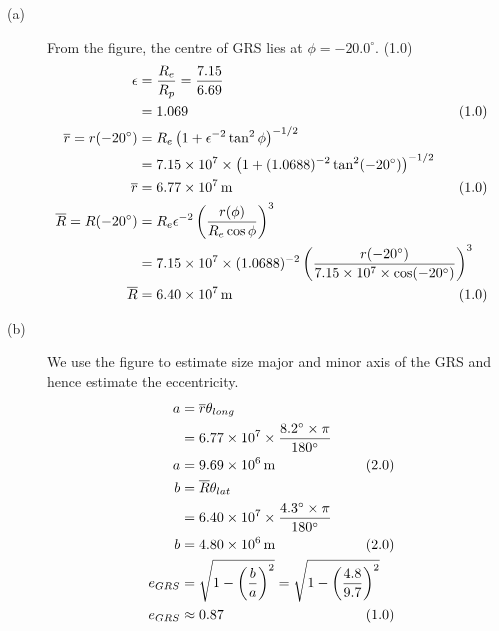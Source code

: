 \begin{description}
\item[(a)] From the figure, the centre of GRS lies at $\phi = -20.0^\circ$. \hfill(1.0)
\begin{align*}
\epsilon &= \frac{R_e}{R_p} = \frac{7.15}{6.69}\\
 &= 1.069 & &\hspace{-2em}(1.0)\\
\overline{r} = r(-20^\circ) &= R_e\left(1 + \epsilon^{-2}\tan^2\phi\right)^{-1/2}\\
 &= 7.15\times10^7 \times \left(1 + (1.0688)^{-2}\tan^2(-20^\circ)\right)^{-1/2}\\
\overline{r} &= 6.77\times10^7\,\mathrm{m} & &\hspace{-2em}(1.0)\\
\overline{R} = R(-20^\circ) &= R_e\epsilon^{-2}\left(\frac{r(\phi)}{R_e\cos\phi}\right)^3\\
 &= 7.15\times10^7 \times (1.0688)^{-2}
   \left(\frac{r(-20^\circ)}{7.15\times10^7\times\cos(-20^\circ)}\right)^3\\
\overline{R} &= 6.40\times10^7\,\mathrm{m} & &\hspace{-2em}(1.0)
\end{align*}

\item[(b)] We use the figure to estimate size major and minor axis of the GRS and hence
estimate the eccentricity.
\begin{align*}
a &= \overline{r}\theta_{long}\\
 &= 6.77\times10^7 \times \frac{8.2^\circ\times\pi}{180^\circ}\\
a &= 9.69\times10^6\,\mathrm{m} & &\hspace{-2em}(2.0)\\
b &= \overline{R}\theta_{lat}\\
 &= 6.40\times10^7 \times \frac{4.3^\circ\times\pi}{180^\circ}\\
b &= 4.80\times10^6\,\mathrm{m} & &\hspace{-2em}(2.0)\\
e_{GRS} &= \sqrt{1 - \left(\frac{b}{a}\right)^2} = \sqrt{1 - \left(\frac{4.8}{9.7}\right)^2}\\
e_{GRS} &\approx 0.87 & &\hspace{-2em}(1.0)
\end{align*}


\end{description}
